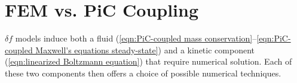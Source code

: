 \section{FEM vs. PiC Coupling}\label{cha:FEM vs. PiC}

    $\delta\!f$ models induce both a fluid (\ref{eqn:PiC-coupled mass conservation}--\ref{eqn:PiC-coupled Maxwell's equations steady-state}) and a kinetic component (\ref{eqn:linearized Boltzmann equation}) that require numerical solution. Each of these two components then offers a choice of possible numerical techniques.
    
    \line

    
    

    \line

